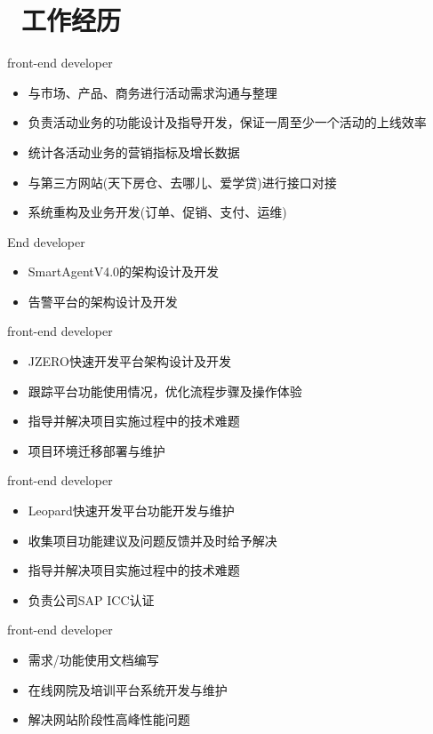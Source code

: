 \documentclass{resume}
\begin{document}
\section{\faMapO\ 工作经历}
front-end developer
\begin{itemize}
  \item 与市场、产品、商务进行活动需求沟通与整理
  \item 负责活动业务的功能设计及指导开发，保证一周至少一个活动的上线效率
  \item 统计各活动业务的营销指标及增长数据
  \item 与第三方网站(天下房仓、去哪儿、爱学贷)进行接口对接
  \item 系统重构及业务开发(订单、促销、支付、运维)
\end{itemize}
End developer
\begin{itemize}
  \item SmartAgentV4.0的架构设计及开发
  \item 告警平台的架构设计及开发
\end{itemize}
front-end developer
\begin{itemize}
  \item JZERO快速开发平台架构设计及开发
  \item 跟踪平台功能使用情况，优化流程步骤及操作体验
  \item 指导并解决项目实施过程中的技术难题
  \item 项目环境迁移部署与维护
\end{itemize}
front-end developer
\begin{itemize}
  \item Leopard快速开发平台功能开发与维护
  \item 收集项目功能建议及问题反馈并及时给予解决
  \item 指导并解决项目实施过程中的技术难题
  \item 负责公司SAP ICC认证
\end{itemize}
front-end developer
\begin{itemize}
  \item 需求/功能使用文档编写
  \item 在线网院及培训平台系统开发与维护
  \item 解决网站阶段性高峰性能问题
\end{itemize}
\end{document}
